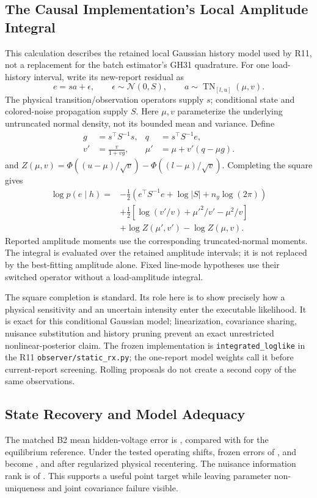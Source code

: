 \subsection{The Causal Implementation's Local Amplitude Integral}

This calculation describes the retained local Gaussian history model used by R11, not a replacement for the batch estimator's GH31 quadrature. For one load-history interval, write its new-report residual as
\[
 e=s a+\epsilon,\qquad \epsilon\sim\mathcal N(0,S),\qquad
 a\sim\operatorname{TN}_{[l,u]}(\mu,v).
\]
The physical transition/observation operators supply $s$; conditional state and colored-noise propagation supply $S$. Here $\mu,v$ parameterize the underlying untruncated normal density, not its bounded mean and variance. Define
\[
 \begin{aligned}
 g&=s^\top S^{-1}s,& q&=s^\top S^{-1}e,\\
 v'&=\frac{v}{1+vg},& \mu'&=\mu+v'(q-\mu g).
 \end{aligned}
\]
and $Z(\mu,v)=\Phi((u-\mu)/\sqrt v)-\Phi((l-\mu)/\sqrt v)$.
Completing the square gives
\begin{align*}
 \log p(e\mid h)={}&-\tfrac12(e^\top S^{-1}e+\log|S|+n_y\log(2\pi))\\
 &+\tfrac12\left[\log(v'/v)+\mu'^2/v'-\mu^2/v\right]\\
 &+\log Z(\mu',v')-\log Z(\mu,v).
\end{align*}
Reported amplitude moments use the corresponding truncated-normal moments. The integral is evaluated over the retained amplitude intervals; it is not replaced by the best-fitting amplitude alone. Fixed line-mode hypotheses use their switched operator without a load-amplitude integral.

The square completion is standard. Its role here is to show precisely how a physical sensitivity and an uncertain intensity enter the executable likelihood. It is exact for this conditional Gaussian model; linearization, covariance sharing, nuisance substitution and history pruning prevent an exact unrestricted nonlinear-posterior claim. The frozen implementation is \texttt{integrated\_loglike} in the R11 \texttt{observer/static\_rx.py}; the one-report model weights call it before current-report screening. Rolling proposals do not create a second copy of the same observations.

\subsection{State Recovery and Model Adequacy}
The matched B2 mean hidden-voltage error is \BTwoTVE{}, compared with \BZeroTVE{} for the equilibrium reference. Under the tested operating shifts, frozen errors of \EZeroHFrozenHalf{}, \EZeroHFrozenOne{} and \EZeroHFrozenMax{} become \EZeroHCorrectedHalf{}, \EZeroHCorrectedOne{} and \EZeroHCorrectedMax{} after regularized physical recentering. The nuisance information rank is \EZeroHRank{} of \EZeroHDimension{}. This supports a useful point target while leaving parameter non-uniqueness and joint covariance failure visible.

